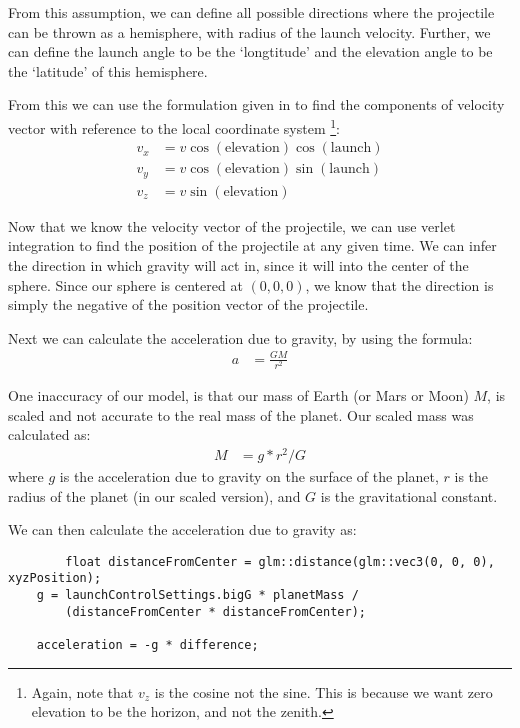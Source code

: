 \documentclass[main.tex]{subfiles}
\begin{document}
From this assumption, we can define all possible directions where the projectile can be thrown as a hemisphere, with radius of the launch velocity. Further, we can define the 
launch angle to be the `longtitude' and the elevation angle to be the `latitude' of this hemisphere.

From this we can use the formulation given in \cite{weissteinSphericalCoordinates} to find the components of velocity vector with reference to the local coordinate system
\footnote{Again, note that $v_z$ is the cosine not the sine. This is because we want zero elevation to be the horizon, and not the zenith.}:
\begin{align*}
    v_x &= v\cos(\text{elevation})\cos(\text{launch})\\
    v_y &= v\cos(\text{elevation})\sin(\text{launch})\\
    v_z &= v\sin(\text{elevation})
\end{align*}

Now that we know the velocity vector of the projectile, we can use verlet integration to find the position of the projectile at any given time.
We can infer the direction in which gravity will act in, since it will into the center of the sphere. Since our sphere is centered at $(0, 0, 0)$,
we know that the direction is simply the negative of the position vector of the projectile.

Next we can calculate the acceleration due to gravity, by using the formula:
\begin{align*}
    a &= \frac{GM}{r^2}
\end{align*}

One inaccuracy of our model, is that our mass of Earth (or Mars or Moon) $M$, is scaled and not accurate to the real mass of the planet. Our scaled
mass was calculated as:
\begin{align*}
    M &= g * r^2 / G
\end{align*}
where $g$ is the acceleration due to gravity on the surface of the planet, $r$ is the radius of the planet (in our scaled version), and $G$ is the gravitational constant.

We can then calculate the acceleration due to gravity as:
\begin{lstlisting}
        float distanceFromCenter = glm::distance(glm::vec3(0, 0, 0), xyzPosition);
    g = launchControlSettings.bigG * planetMass /
        (distanceFromCenter * distanceFromCenter);

    acceleration = -g * difference;
\end{lstlisting}
\end{document}
